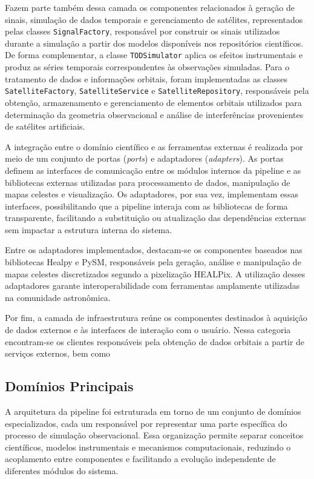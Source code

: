 Fazem parte também dessa camada os componentes relacionados à geração de sinais, simulação de dados temporais e gerenciamento de satélites, representados pelas classes \texttt{SignalFactory}, responsável por construir os sinais utilizados durante a simulação a partir dos modelos disponíveis nos repositórios científicos. De forma complementar, a classe \texttt{TODSimulator} aplica os efeitos instrumentais e produz as séries temporais correspondentes às observações simuladas. Para o tratamento de dados e informações orbitais, foram implementadas as classes \texttt{SatelliteFactory}, \texttt{SatelliteService} e \texttt{SatelliteRepository}, responsáveis pela obtenção, armazenamento e gerenciamento de elementos orbitais utilizados para determinação da geometria observacional e análise de interferências provenientes de satélites artificiais.

A integração entre o domínio científico e as ferramentas externas é realizada por meio de um conjunto de portas (\textit{ports}) e adaptadores (\textit{adapters}). As portas definem as interfaces de comunicação entre os módulos internos da pipeline e as bibliotecas externas utilizadas para processamento de dados, manipulação de mapas celestes e visualização. Os adaptadores, por sua vez, implementam essas interfaces, possibilitando que a pipeline interaja com as bibliotecas de forma transparente, facilitando a substituição ou atualização das dependências externas sem impactar a estrutura interna do sistema.

Entre os adaptadores implementados, destacam-se os componentes baseados nas bibliotecas Healpy e PySM, responsáveis pela geração, análise e manipulação de mapas celestes discretizados segundo a pixelização HEALPix. A utilização desses adaptadores garante interoperabilidade com ferramentas amplamente utilizadas na comunidade astronômica.

Por fim, a camada de infraestrutura reúne os componentes destinados à aquisição de dados externos e às interfaces de interação com o usuário. Nessa categoria encontram-se os clientes responsáveis pela obtenção de dados orbitais a partir de serviços externos, bem como


\subsection{Domínios Principais}
A arquitetura da pipeline foi estruturada em torno de um conjunto de domínios especializados, cada um responsável por representar uma parte específica do processo de simulação observacional. Essa organização permite separar conceitos científicos, modelos instrumentais e mecanismos computacionais, reduzindo o acoplamento entre componentes e facilitando a evolução independente de diferentes módulos do sistema.

